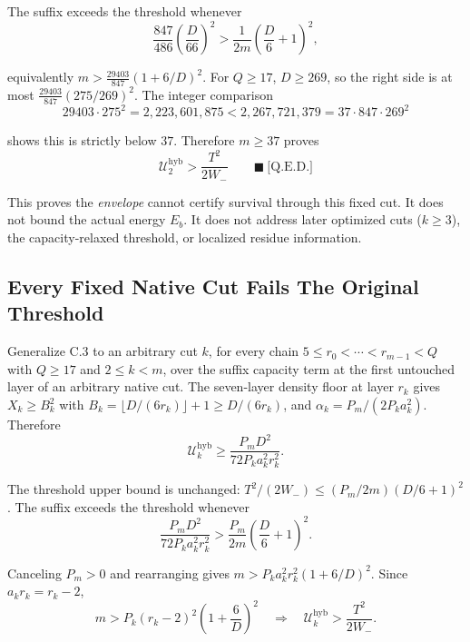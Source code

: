 The suffix exceeds the threshold whenever
\begin{equation*}
\frac{847}{486}\left(\frac{D}{66}\right)^2>\frac1{2m}\left(\frac D6+1\right)^2,
\end{equation*}

equivalently $m>\frac{29403}{847}(1+6/D)^2$. For $Q\ge17$, $D\ge269$, so the
right side is at most $\frac{29403}{847}(275/269)^2$. The integer comparison
\begin{equation*}
29403\cdot275^2=2{,}223{,}601{,}875\lt2{,}267{,}721{,}379=37\cdot847\cdot269^2
\end{equation*}

shows this is strictly below $37$. Therefore $m\ge37$ proves
\begin{equation*}
\mathcal U_2^{\mathrm{hyb}}>\frac{T^2}{2W_-}
\qquad\blacksquare\ \text{[Q.E.D.]}
\end{equation*}

This proves the \emph{envelope} cannot certify survival through this
fixed cut. It does not bound the actual energy $E_b$. It does not address
later optimized cuts ($k\ge3$), the capacity-relaxed threshold, or localized
residue information.

\subsection{Every Fixed Native Cut Fails The Original Threshold}
\label{sec:appendix-c-4}

Generalize C.3 to an arbitrary cut $k$, for every chain
$5\le r_0<\cdots<r_{m-1}<Q$ with $Q\ge17$ and $2\le k<m$, over the suffix
capacity term at the first untouched layer of an arbitrary native cut. The
seven-layer density floor at layer $r_k$ gives
$X_k\ge B_k^2$ with $B_k=\lfloor D/(6r_k)\rfloor+1\ge D/(6r_k)$, and
$\alpha_k=P_m/(2P_ka_k^2)$. Therefore
\begin{equation*}
\mathcal U_k^{\mathrm{hyb}}
\ge\frac{P_mD^2}{72P_ka_k^2r_k^2}.
\end{equation*}

The threshold upper bound is unchanged:
$T^2/(2W_-)\le(P_m/2m)(D/6+1)^2$. The suffix exceeds the threshold whenever
\begin{equation*}
\frac{P_mD^2}{72P_ka_k^2r_k^2}>\frac{P_m}{2m}\left(\frac D6+1\right)^2.
\end{equation*}

Canceling $P_m>0$ and rearranging gives $m>P_ka_k^2r_k^2(1+6/D)^2$. Since
$a_kr_k=r_k-2$,
\begin{equation*}
m>P_k(r_k-2)^2\left(1+\frac6D\right)^2
\quad\Longrightarrow\quad
\mathcal U_k^{\mathrm{hyb}}>\frac{T^2}{2W_-}.
\end{equation*}

